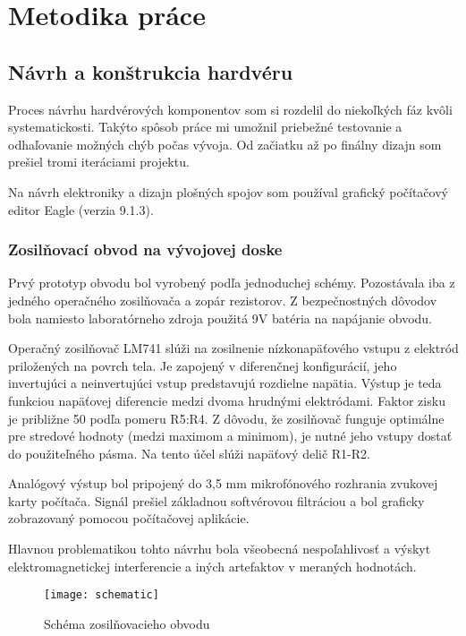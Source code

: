 \documentclass[titlepage,12pt]{article}
\begin{document}
\newpage
\section{Metodika práce}
\subsection{Návrh a konštrukcia hardvéru}
Proces návrhu hardvérových komponentov som si rozdelil do niekoľkých fáz kvôli systematickosti. Takýto spôsob práce mi umožnil priebežné testovanie a odhaľovanie možných chýb počas vývoja. Od začiatku až po finálny dizajn som prešiel tromi iteráciami projektu. 

Na návrh elektroniky a dizajn plošných spojov som používal grafický počítačový editor Eagle (verzia 9.1.3).

\subsubsection{Zosilňovací obvod na vývojovej doske}
Prvý prototyp obvodu bol vyrobený podľa jednoduchej schémy. Pozostávala iba z jedného operačného zosilňovača a zopár rezistorov. Z bezpečnostných dôvodov bola namiesto laboratórneho zdroja použitá 9V batéria na napájanie obvodu. 

Operačný zosilňovač LM741 slúži na zosilnenie nízkonapäťového vstupu z elektród priložených na povrch tela. Je zapojený v diferenčnej konfigurácií, jeho invertujúci a neinvertujúci vstup predstavujú rozdielne napätia. Výstup je teda funkciou napäťovej diferencie medzi dvoma hrudnými elektródami. Faktor zisku je približne 50 podľa pomeru R5:R4. Z dôvodu, že zosilňovač funguje optimálne pre stredové hodnoty (medzi maximom a minimom), je nutné jeho vstupy dostať do použiteľného pásma. Na tento účel slúži napäťový delič R1-R2.

Analógový výstup bol pripojený do 3,5 mm mikrofónového rozhrania zvukovej karty počítača. Signál prešiel základnou softvérovou filtráciou a bol graficky zobrazovaný pomocou počítačovej aplikácie.

Hlavnou problematikou tohto návrhu bola všeobecná nespoľahlivosť a výskyt elektromagnetickej interferencie a iných artefaktov v meraných hodnotách.


\begin{figure}[!ht]
\begin{center}
\texttt{[image: schematic]}
\caption{Schéma zosilňovacieho obvodu}
\end{center}
\end{figure}
\end{document}
